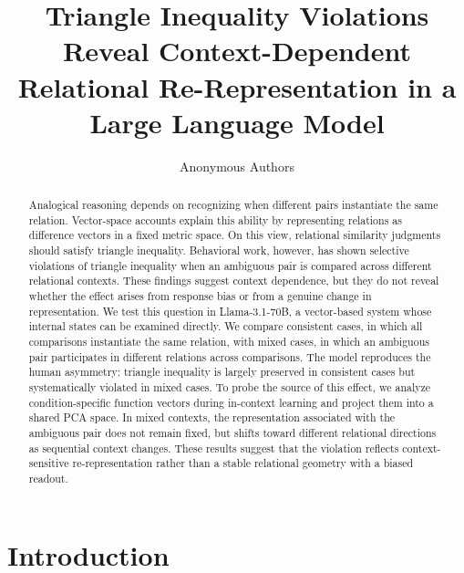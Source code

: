 \documentclass{ccn}
\title{Triangle Inequality Violations Reveal Context-Dependent Relational Re-Representation in a Large Language Model}
\author{Anonymous Authors}
\begin{document}
\maketitle

\begin{abstract}
Analogical reasoning depends on recognizing when different pairs instantiate
the same relation. Vector-space accounts explain this ability by representing
relations as difference vectors in a fixed metric space. On this view,
relational similarity judgments should satisfy triangle inequality. Behavioral
work, however, has shown selective violations of triangle inequality when an
ambiguous pair is compared across different relational contexts. These findings
suggest context dependence, but they do not reveal whether the effect arises
from response bias or from a genuine change in representation. We test this
question in Llama-3.1-70B, a vector-based system whose internal states can be
examined directly. We compare consistent cases, in which all comparisons
instantiate the same relation, with mixed cases, in which an ambiguous pair
participates in different relations across comparisons. The model reproduces
the human asymmetry: triangle inequality is largely preserved in consistent
cases but systematically violated in mixed cases. To probe the source of this
effect, we analyze condition-specific function vectors during in-context
learning and project them into a shared PCA space. In mixed contexts, the
representation associated with the ambiguous pair does not remain fixed, but
shifts toward different relational directions as sequential context changes.
These results suggest that the violation reflects context-sensitive
re-representation rather than a stable relational geometry with a biased
readout.
\end{abstract}

\section{Introduction}
\end{document}

